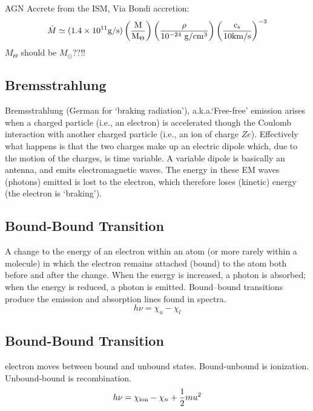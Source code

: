 \documentclass[11pt]{article}
\begin{document}
AGN Accrete from the ISM, Via Bondi accretion:
    \begin{equation}
      \dot{M} \simeq (1.4\times10^{11} \rm{g/s}) \left( \frac{M}{M_{\Theta}} \right) \left( \frac{\rho}{10^{-24}\ \rm{g / cm^{3}}} \right)  \left( \frac{c_s}{10 \rm{km/s}} \right)^{-3}
    \end{equation}
 $M_{\Theta}$ should be $M_{\odot}$??!!

\subsection*{Bremsstrahlung}
Bremsstrahlung (German for ‘braking radiation’), a.k.a.`Free-free'
emission arises when a charged particle (i.e., an electron) is
accelerated though the Coulomb interaction with another charged
particle (i.e., an ion of charge $Ze$). Effectively what happens is
that the two charges make up an electric dipole which, due to the
motion of the charges, is time variable. A variable dipole is
basically an antenna, and emits electromagnetic waves. The energy in
these EM waves (photons) emitted is lost to the electron, which
therefore loses (kinetic) energy (the electron is ‘braking’).

\subsection*{Bound-Bound Transition}   
A change to the energy of an electron within an atom (or more rarely
within a molecule) in which the electron remains attached (bound) to
the atom both before and after the change. When the energy
is increased, a photon is absorbed; when the energy is reduced, a
photon is emitted. Bound–bound transitions produce the emission and
absorption lines found in spectra.
\begin{equation}
 h\nu = \chi_{u} - \chi_{l}
\end{equation}

\subsection*{Bound-Bound Transition}   
electron moves between bound and unbound states.
Bound-unbound is ionization. 
Unbound-bound is recombination. 
\begin{equation}
 h\nu = \chi_{\rm ion} - \chi_{n} + \frac{1}{2} m u^{2}
\end{equation}
\end{document}
